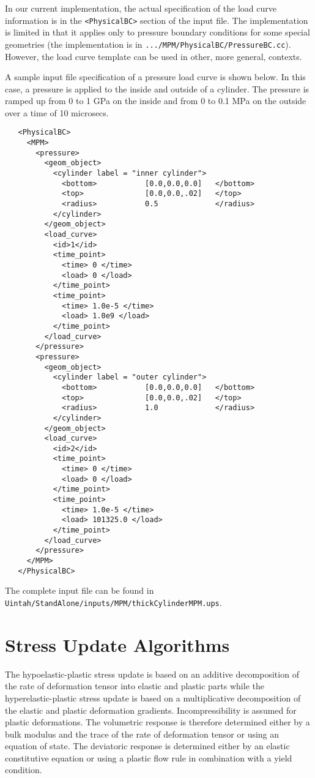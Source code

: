 In our current implementation, the actual specification of the load curve 
information is in the \verb|<PhysicalBC>| section of the input file.  The
implementation is limited in that it applies only to pressure boundary 
conditions for some special geometries (the implementation is in 
\verb|.../MPM/PhysicalBC/PressureBC.cc|).  However, the load curve template can
be used in other, more general, contexts.

A sample input file specification of a pressure load curve is shown below.
In this case, a pressure is applied to the inside and outside of a cylinder.
The pressure is ramped up from 0 to 1 GPa on the inside and from 0 to 0.1 MPa
on the outside over a time of 10 microsecs. 
\begin{verbatim}
   <PhysicalBC>
     <MPM>
       <pressure>
         <geom_object>
           <cylinder label = "inner cylinder">
             <bottom>           [0.0,0.0,0.0]   </bottom>
             <top>              [0.0,0.0,.02]   </top>
             <radius>           0.5             </radius>
           </cylinder>
         </geom_object>
         <load_curve>
           <id>1</id>
           <time_point>
             <time> 0 </time>
             <load> 0 </load>
           </time_point>
           <time_point>
             <time> 1.0e-5 </time>
             <load> 1.0e9 </load>
           </time_point>
         </load_curve>
       </pressure>
       <pressure>
         <geom_object>
           <cylinder label = "outer cylinder">
             <bottom>           [0.0,0.0,0.0]   </bottom>
             <top>              [0.0,0.0,.02]   </top>
             <radius>           1.0             </radius>
           </cylinder>
         </geom_object>
         <load_curve>
           <id>2</id>
           <time_point>
             <time> 0 </time>
             <load> 0 </load>
           </time_point>
           <time_point>
             <time> 1.0e-5 </time>
             <load> 101325.0 </load>
           </time_point>
         </load_curve>
       </pressure>
     </MPM>
   </PhysicalBC>
\end{verbatim}
The complete input file can be found in \verb|Uintah/StandAlone/inputs/MPM/thickCylinderMPM.ups|.

\section{Stress Update Algorithms}
The hypoelastic-plastic stress update is based on an additive
decomposition of the rate of deformation tensor into elastic
and plastic parts while the hyperelastic-plastic stress update
is based on a multiplicative decomposition of the elastic and 
plastic deformation gradients.  Incompressibility is assumed
for plastic deformations.  The volumetric response is therefore
determined either by a bulk modulus and the trace of the rate
of deformation tensor or using an equation of state.  The 
deviatoric response is determined either by an elastic constitutive 
equation or using a plastic flow rule in combination with a 
yield condition. 
  
